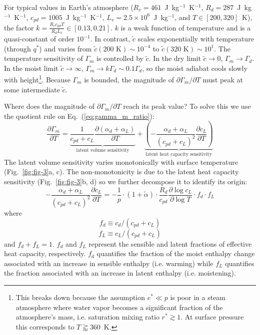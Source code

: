 \documentclass[]{ametsocV6.1}
\begin{document}
For typical values in Earth's atmosphere ($R_v=461$~J~kg$^{-1}$~K$^{-1}$, $R_d=287$~J~kg$^{-1}$~K$^{-1}$, $c_{pd}=1005$~J~kg$^{-1}$~K$^{-1}$, $L_v=2.5\times10^6$~J~kg$^{-1}$, and $T \in [200, 320]$~K), the factor $k=\frac{R_v c_{pd}T}{R_dL_v}\in [0.13, 0.21]$. $k$ is a weak function of temperature and is a quasi-constant of order $10^{-1}$. In contrast, $\tilde{c}$ scales exponentially with temperature (through $q^*$) and varies from $\tilde{c}(200\text{~K})\sim 10^{-4}$ to $\tilde{c}(320\text{~K})\sim 10^{1}$. The temperature sensitivity of $\Gamma_m$ is controlled by $\tilde{c}$. In the dry limit $\tilde{c}\to0$, $\Gamma_m\to\Gamma_d$. In the moist limit $\tilde{c} \to \infty$, $\Gamma_m\to k\Gamma_d\sim 0.1\Gamma_d$, so the moist adiabat cools slowly with height\footnote{This breaks down because the assumption $e^*\ll p$ is poor in a steam atmosphere where water vapor becomes a significant fraction of the atmosphere's mass, i.e. saturation mixing ratio $r^*\gtrsim1$. At surface pressure this corresponds to $T\gtrapprox 360$~K.}. Because $\Gamma_m$ is bounded, the magnitude of $\partial\Gamma_m/\partial T$ must peak at some intermediate $\tilde{c}$.

Where does the magnitude of $\partial\Gamma_m/\partial T$ reach its peak value? To solve this we use the quotient rule on Eq.~(\ref{eq:gamma_m_ratio}):
\begin{equation}
\frac{\partial\Gamma_m}{\partial T} = \underbrace{\frac{1}{c_{pd} + c_L}\frac{\partial(\alpha_d + \alpha_L)}{\partial T}}_{\text{latent volume sensitivity}} + \underbrace{\left(-\frac{\alpha_d + \alpha_L}{(c_{pd} + c_L)^2}\frac{\partial c_L}{\partial T}\right)}_{\text{latent heat capacity sensitivity}} \label{eq:decomposition}
\end{equation}
The latent volume sensitivity varies monotonically with surface temperature (Fig.~\ref{fig:fig-3}a, c). The non-monotonicity is due to the latent heat capacity sensitivity (Fig.~\ref{fig:fig-3}b, d) so we further decompose it to identify its origin:
\begin{equation}
-\frac{\alpha_d + \alpha_L}{(c_{pd} + c_L)^2}\frac{\partial c_L}{\partial T} = -\frac{1}{p} \cdot \left(1 + \tilde{\alpha}\right) \cdot \frac{R_d}{c_{pd}}\frac{\partial\log{c_L}}{\partial \log{T}} \cdot f_d \cdot f_L \label{eq:term_b_intermediate}
\end{equation}
where
\begin{equation}
f_d \equiv c_{d}/(c_{pd} + c_L) \label{eq:f_d}
\end{equation}
\begin{equation}
f_L \equiv c_{L}/(c_{pd} + c_L) \label{eq:f_L}
\end{equation}
and $f_d + f_L = 1$. $f_d$ and $f_L$ represent the sensible and latent fractions of effective heat capacity, respectively. $f_d$ quantifies the fraction of the moist enthalpy change associated with an increase in sensible enthalpy (i.e. warming) while $f_L$ quantifies the fraction associated with an increase in latent enthalpy (i.e. moistening).
\end{document}
